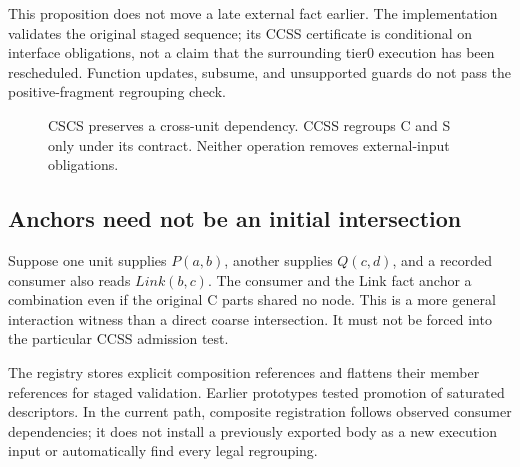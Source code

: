 \documentclass[11pt,a4paper]{article}
\begin{document}
This proposition does not move a late external fact earlier. The implementation
validates the original staged sequence; its CCSS certificate is conditional on
interface obligations, not a claim that the surrounding tier0 execution has been
rescheduled. Function updates, subsume, and unsupported guards do not pass the
positive-fragment regrouping check.

\begin{figure}[t]
\centering
{}
\caption{CSCS preserves a cross-unit dependency. CCSS regroups C and S only under
its contract. Neither operation removes external-input obligations.}
\end{figure}

\MathCCSS

\subsection{Anchors need not be an initial intersection}
Suppose one unit supplies $P(a,b)$, another supplies $Q(c,d)$, and a recorded
consumer also reads $Link(b,c)$. The consumer and the Link fact anchor a
combination even if the original C parts shared no node. This is a more general
interaction witness than a direct coarse intersection. It must not be forced
into the particular CCSS admission test.

The registry stores explicit composition references and flattens their member
references for staged validation. Earlier prototypes tested promotion of
saturated descriptors. In the current path, composite registration follows
observed consumer dependencies; it does not install a previously exported body
as a new execution input or automatically find every legal regrouping.
\end{document}
